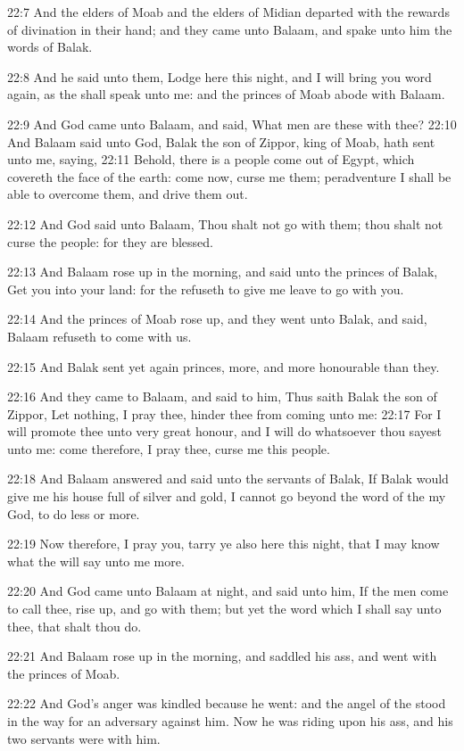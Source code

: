 22:7 And the elders of Moab and the elders of Midian departed with the
rewards of divination in their hand; and they came unto Balaam, and
spake unto him the words of Balak.

22:8 And he said unto them, Lodge here this night, and I will bring
you word again, as the \LORD shall speak unto me: and the princes of
Moab abode with Balaam.

22:9 And God came unto Balaam, and said, What men are these with thee?
22:10 And Balaam said unto God, Balak the son of Zippor, king of Moab,
hath sent unto me, saying, 22:11 Behold, there is a people come out of
Egypt, which covereth the face of the earth: come now, curse me them;
peradventure I shall be able to overcome them, and drive them out.

22:12 And God said unto Balaam, Thou shalt not go with them; thou
shalt not curse the people: for they are blessed.

22:13 And Balaam rose up in the morning, and said unto the princes of
Balak, Get you into your land: for the \LORD refuseth to give me leave
to go with you.

22:14 And the princes of Moab rose up, and they went unto Balak, and
said, Balaam refuseth to come with us.

22:15 And Balak sent yet again princes, more, and more honourable than
they.

22:16 And they came to Balaam, and said to him, Thus saith Balak the
son of Zippor, Let nothing, I pray thee, hinder thee from coming unto
me: 22:17 For I will promote thee unto very great honour, and I will
do whatsoever thou sayest unto me: come therefore, I pray thee, curse
me this people.

22:18 And Balaam answered and said unto the servants of Balak, If
Balak would give me his house full of silver and gold, I cannot go
beyond the word of the \LORD my God, to do less or more.

22:19 Now therefore, I pray you, tarry ye also here this night, that I
may know what the \LORD will say unto me more.

22:20 And God came unto Balaam at night, and said unto him, If the men
come to call thee, rise up, and go with them; but yet the word which I
shall say unto thee, that shalt thou do.

22:21 And Balaam rose up in the morning, and saddled his ass, and went
with the princes of Moab.

22:22 And God's anger was kindled because he went: and the angel of
the \LORD stood in the way for an adversary against him. Now he was
riding upon his ass, and his two servants were with him.


